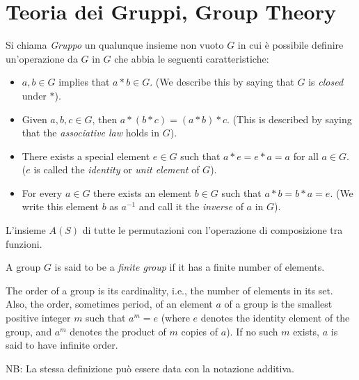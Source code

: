\section{Teoria dei Gruppi, Group Theory}
\begin{definizione}
Si chiama \textit{Gruppo} un qualunque insieme non vuoto $G$ in cui è possibile definire un'operazione da $G$ in $G$ che abbia le seguenti caratteristiche:
\begin{itemize}
 \item $a, b \in G$ implies that $a*b \in G$. (We describe this by saying that $G$ is \textit{closed} under $*$).
 \item Given $a, b, c \in G$, then $a * (b*c) = (a*b)*c$. (This is described by saying that the \textit{associative law} holds in $G$).
 \item There exists a special element $e \in G$ such that $a*e=e*a=a$ for all $a \in G$. ($e$ is called the \textit{identity} or \textit{unit element} of $G$).
 \item For every $a \in G$ there exists an element $b \in G$ such that $a*b=b*a=e$. (We write this element $b$ as $a^{-1}$ and call it the \textit{inverse} of $a$ in $G$).
\end{itemize}
\end{definizione}

\begin{osservazione}
L'insieme $A(S)$ di tutte le permutazioni con l'operazione di composizione tra funzioni.
\end{osservazione}

\begin{definizione}
A group $G$ is said to be a \textit{finite group} if it has a finite number of elements.
\end{definizione}

\begin{definizione}
The order of a group is its cardinality, i.e., the number of elements in its set. Also, the order, sometimes period, of an element
$a$ of a group is the smallest positive integer $m$ such that $a^m=e$ (where $e$ denotes the identity element of the group, and $a^m$
denotes the product of $m$ copies of $a$). If no such $m$ exists, $a$ is said to have infinite order.
\end{definizione}

\begin{osservazione}
NB: La stessa definizione può essere data con la notazione additiva.
\end{osservazione}

